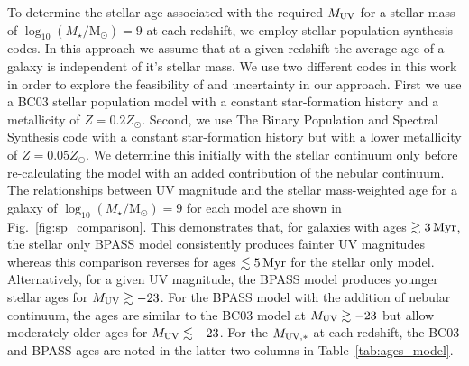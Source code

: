\documentclass[fleqn,usenatbib]{mnras}
\begin{document}
To determine the stellar age associated with the required $M_{\rm UV}$ for a stellar mass of $\log_{10}(M_{\star}/ \mathrm{M_{\odot}})=9$ at each redshift, we employ stellar population synthesis codes. In this approach we assume that at a given redshift the average age of a galaxy is independent of it's stellar mass. We use two different codes in this work in order to explore the feasibility of and uncertainty in our approach. First we use a BC03 stellar population model \citep{bruzual2003} with a constant star-formation history and a metallicity of $Z=0.2 Z_{\odot}$. Second, we use The Binary Population and Spectral Synthesis code \citep[BPASS;][]{Eldridge2017} with a constant star-formation history but with a lower metallicity of $Z=0.05 Z_{\odot}$. We determine this initially with the stellar continuum only before re-calculating the model with an added contribution of the nebular continuum. The relationships between UV magnitude and the stellar mass-weighted age for a galaxy of $\log_{10}(M_{\star} / \mathrm{M_{\odot}})=9$ for each model are shown in Fig.~\ref{fig:sp_comparison}. This demonstrates that, for galaxies with ages $\gtrsim 3 \, \rm Myr$, the stellar only BPASS model consistently produces fainter UV magnitudes whereas this comparison reverses for ages $\lesssim 5 \, \rm Myr$ for the stellar only model. Alternatively, for a given UV magnitude, the BPASS model produces younger stellar ages for $M_{\rm UV}\gtrsim -23$. For the BPASS model with the addition of nebular continuum, the ages are similar to the BC03 model at $M_{\rm UV}\gtrsim -23$ but allow moderately older ages for $M_{\rm UV}\lesssim -23$. For the $M_{\rm UV, *}$ at each redshift, the BC03 and BPASS ages are noted in the latter two columns in Table~\ref{tab:ages_model}. 
\end{document}
